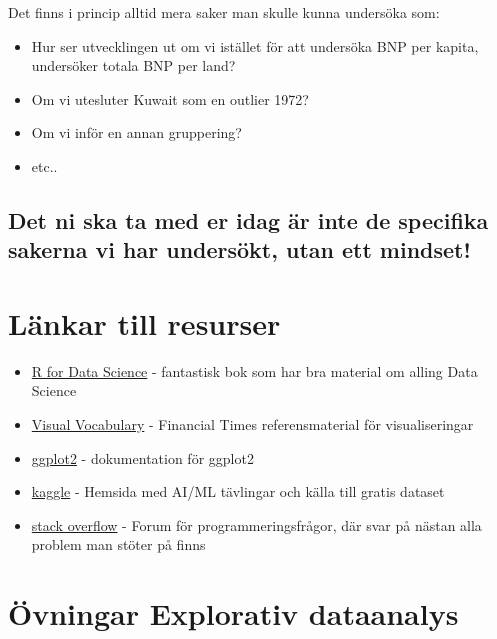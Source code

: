 \documentclass[
]{book}
\begin{document}
Det finns i princip alltid mera saker man skulle kunna undersöka som:

\begin{itemize}
\item
  Hur ser utvecklingen ut om vi istället för att undersöka BNP per kapita, undersöker totala BNP per land?
\item
  Om vi utesluter Kuwait som en outlier 1972?
\item
  Om vi inför en annan gruppering?
\item
  etc..
\end{itemize}

\hypertarget{det-ni-ska-ta-med-er-idag-uxe4r-inte-de-specifika-sakerna-vi-har-undersuxf6kt-utan-ett-mindset}{%
\subsection{Det ni ska ta med er idag är inte de specifika sakerna vi har undersökt, utan ett mindset!}\label{det-ni-ska-ta-med-er-idag-uxe4r-inte-de-specifika-sakerna-vi-har-undersuxf6kt-utan-ett-mindset}}

\hypertarget{luxe4nkar-till-resurser}{%
\section{Länkar till resurser}\label{luxe4nkar-till-resurser}}

\begin{itemize}
\item
  \href{https://r4ds.had.co.nz/}{R for Data Science} - fantastisk bok som har bra material om alling Data Science
\item
  \href{https://ft-interactive.github.io/visual-vocabulary/}{Visual Vocabulary} - Financial Times referensmaterial för visualiseringar
\item
  \href{https://ggplot2.tidyverse.org/}{ggplot2} - dokumentation för ggplot2
\item
  \href{https://www.kaggle.com/}{kaggle} - Hemsida med AI/ML tävlingar och källa till gratis dataset
\item
  \href{https://www.stackoverflow.com}{stack overflow} - Forum för programmeringsfrågor, där svar på nästan alla problem man stöter på finns
\end{itemize}

\hypertarget{uxf6vningar-explorativ-dataanalys}{%
\section{Övningar Explorativ dataanalys}\label{uxf6vningar-explorativ-dataanalys}}
\end{document}
